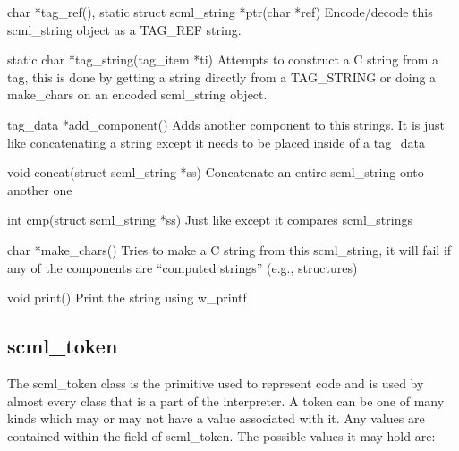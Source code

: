 \begin{cprototypelist}
  \item[char *tag_ref(), static struct scml_string *ptr(char *ref)]
  Encode/decode this scml\_string object as a TAG\_REF string.

  \item[static char *tag_string(tag_item *ti)]
  Attempts to construct a C string from a tag, this is done by getting a
  string directly from a TAG\_STRING or doing a make\_chars on an encoded
  scml\_string object.

  \item[tag_data *add_component()]
  Adds another component to this strings.  It is just like concatenating a string
  except it needs to be placed inside of a tag\_data

  \item[void concat(struct scml_string *ss)]
  Concatenate an entire scml\_string onto another one

  \item[int cmp(struct scml_string *ss)]
  Just like  except it compares scml\_strings

  \item[char *make_chars()]
  Tries to make a C string from this scml\_string, it will fail if any of the
  components are ``computed strings'' (e.g., \CAST{} structures)

  \item[void print()]
  Print the string using w_printf
\end{cprototypelist}

\subsection{scml\_token}

The scml\_token class is the primitive used to represent \SCML{} code and is used
by almost every class that is a part of the interpreter.  A token can be one
of many kinds which may or may not have a value associated with it.  Any
values are contained within the  field of scml\_token.  The
possible values it may hold are:

